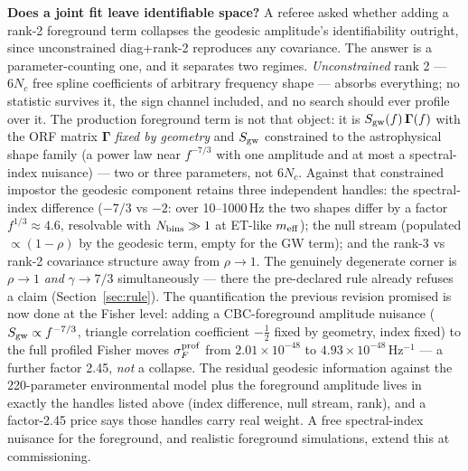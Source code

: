 \documentclass[11pt]{article}
\begin{document}
\textbf{Does a joint fit leave identifiable space?} A referee asked whether adding a rank-2 foreground term collapses the geodesic amplitude's identifiability outright, since unconstrained diag+rank-2 reproduces any covariance. The answer is a parameter-counting one, and it separates two regimes. \emph{Unconstrained} rank 2 --- $6N_c$ free spline coefficients of arbitrary frequency shape --- absorbs everything; no statistic survives it, the sign channel included, and no search should ever profile over it. The production foreground term is not that object: it is $S_{\rm gw}(f)\,\bm{\Gamma}(f)$ with the ORF matrix $\bm{\Gamma}$ \emph{fixed by geometry} and $S_{\rm gw}$ constrained to the astrophysical shape family (a power law near $f^{-7/3}$ with one amplitude and at most a spectral-index nuisance) --- two or three parameters, not $6N_c$. Against that constrained impostor the geodesic component retains three independent handles: the spectral-index difference ($-7/3$ vs $-2$: over 10--1000\,Hz the two shapes differ by a factor $f^{1/3} \approx 4.6$, resolvable with $N_{\rm bins} \gg 1$ at ET-like $m_{\rm eff}$); the null stream (populated $\propto (1-\rho)$ by the geodesic term, empty for the GW term); and the rank-3 vs rank-2 covariance structure away from $\rho \to 1$. The genuinely degenerate corner is $\rho \to 1$ \emph{and} $\gamma \to 7/3$ simultaneously --- there the pre-declared rule already refuses a claim (Section~\ref{sec:rule}). The quantification the previous revision promised is now done at the Fisher level: adding a CBC-foreground amplitude nuisance ($S_{\rm gw}\propto f^{-7/3}$, triangle correlation coefficient $-\tfrac12$ fixed by geometry, index fixed) to the full profiled Fisher moves $\sigma_F^{\rm prof}$ from $2.01\times10^{-48}$ to $4.93\times10^{-48}\,\mathrm{Hz^{-1}}$ --- a further factor 2.45, \emph{not} a collapse. The residual geodesic information against the 220-parameter environmental model plus the foreground amplitude lives in exactly the handles listed above (index difference, null stream, rank), and a factor-2.45 price says those handles carry real weight. A free spectral-index nuisance for the foreground, and realistic foreground simulations, extend this at commissioning.
\end{document}
